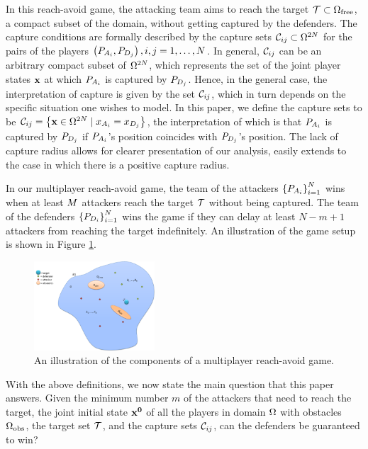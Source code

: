 In this reach-avoid game, the attacking team aims to reach the target $\mathcal{T}\subset\Omega_{\text{free}}$, a compact subset of the domain, without getting captured by the defenders. 
The capture conditions are formally described by the capture sets $\mathcal{C}_{ij}\subset\Omega^{2N}$ for the pairs of the players $\left(P_{A_{i}},P_{D_{j}}\right),i,j=1,\ldots,N$. In general, $\mathcal{C}_{ij}$ can be an arbitrary compact subset of $\Omega^{2N}$, which represents the set of the joint player states $\mathbf{x}$ at which $P_{A_{i}}$ is captured by $P_{D_{j}}$. Hence, in the general case, the interpretation of capture is given by the set $\mathcal{C}_{ij}$, which in turn depends on the specific situation one wishes to model. In this paper, we define the capture sets to be $\mathcal{C}_{ij} = \left\{\mathbf{x}\in\Omega^{2N} \mid x_{A_{i}}=x_{D_{j}} \right\}$, the interpretation of which is that $P_{A_{i}}$ is captured by $P_{D_{j}}$ if $P_{A_{i}}$'s position coincides with $P_{D_{j}}$'s position. The lack of capture radius allows for clearer presentation of our analysis, easily extends to the case in which there is a positive capture radius.

In our multiplayer reach-avoid game, the team of the attackers $\left\{P_{A_{i}}\right\}_{i=1}^N$ wins when at least $M$ attackers reach the target $\mathcal{T}$ without being captured. The team of the defenders $\left\{P_{D_{i}}\right\}_{i=1}^N$ wins the game if they can delay at least $N-m+1$ attackers from reaching the target indefinitely. An illustration of the game setup is shown in Figure \ref{fig:mp_form}.

\begin{figure}[h]
\centering
\includegraphics[width=0.4\textwidth]{"fig/formulation"}
\caption{An illustration of the components of a multiplayer reach-avoid game.}
\label{fig:mp_form}
\end{figure}

With the above definitions, we now state the main question that this paper answers. Given the minimum number $m$ of the attackers that need to reach the target, the joint initial state $\mathbf{x^0}$ of all the players in domain $\Omega$ with obstacles $\Omega_{\text{obs}}$, the target set $\mathcal{T}$, and the capture sets $\mathcal{C}_{ij}$, can the defenders be guaranteed to win?

